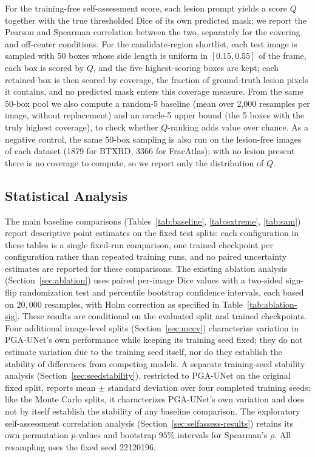 For the training-free self-assessment score, each lesion prompt yields a score $Q$ together with the true thresholded Dice of its own predicted mask; we report the Pearson and Spearman correlation between the two, separately for the covering and off-center conditions. For the candidate-region shortlist, each test image is sampled with 50 boxes whose side length is uniform in $[0.15,0.55]$ of the frame, each box is scored by $Q$, and the five highest-scoring boxes are kept; each retained box is then scored by coverage, the fraction of ground-truth lesion pixels it contains, and no predicted mask enters this coverage measure. From the same 50-box pool we also compute a random-5 baseline (mean over 2,000 resamples per image, without replacement) and an oracle-5 upper bound (the 5 boxes with the truly highest coverage), to check whether $Q$-ranking adds value over chance. As a negative control, the same 50-box sampling is also run on the lesion-free images of each dataset (1879 for BTXRD, 3366 for FracAtlas); with no lesion present there is no coverage to compute, so we report only the distribution of $Q$.

\subsection{Statistical Analysis}
The main baseline comparisons (Tables~\ref{tab:baseline}, \ref{tab:extreme}, \ref{tab:sam}) report descriptive point estimates on the fixed test splits: each configuration in these tables is a single fixed-run comparison, one trained checkpoint per configuration rather than repeated training runs, and no paired uncertainty estimates are reported for these comparisons. The existing ablation analysis (Section~\ref{sec:ablation}) uses paired per-image Dice values with a two-sided sign-flip randomization test and percentile bootstrap confidence intervals, each based on $20{,}000$ resamples, with Holm correction as specified in Table~\ref{tab:ablation-sig}. These results are conditional on the evaluated split and trained checkpoints. Four additional image-level splits (Section~\ref{sec:mccv}) characterize variation in PGA-UNet's own performance while keeping its training seed fixed; they do not estimate variation due to the training seed itself, nor do they establish the stability of differences from competing models. A separate training-seed stability analysis (Section~\ref{sec:seedstability}), restricted to PGA-UNet on the original fixed split, reports mean $\pm$ standard deviation over four completed training seeds; like the Monte Carlo splits, it characterizes PGA-UNet's own variation and does not by itself establish the stability of any baseline comparison. The exploratory self-assessment correlation analysis (Section~\ref{sec:selfassess-results}) retains its own permutation $p$-values and bootstrap $95\%$ intervals for Spearman's $\rho$. All resampling uses the fixed seed 22120196.

